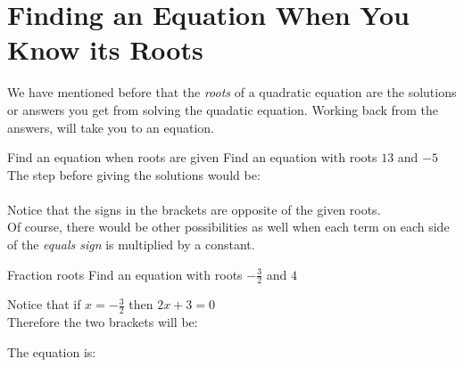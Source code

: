 
\section{Finding an Equation When You Know its Roots}

We have mentioned before that the \textit{roots} of a quadratic equation are the solutions or answers you get from solving the quadatic equation.  Working back from the answers, will take you to an equation.

\begin{wex}{Find an equation when roots are given}
{Find an equation with roots $13$ and $-5$\\}{
The step before giving the solutions would be:\\
\\
Notice that the signs in the brackets are opposite of the given roots.\\
Of course, there would be other possibilities as well when each term on each side of the \textit{equals sign} is multiplied by a constant.}
\end{wex}

\begin{wex}{Fraction roots}
{Find an equation with roots $-\frac{3}{2}$  and $4$\\}{
Notice that if $x = -\frac{3}{2}$ then $2x + 3 = 0$\\
Therefore the two brackets will be:\\

The equation is:\\
}
\end{wex}

